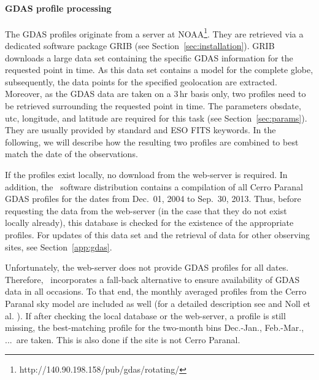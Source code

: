 \paragraph*{GDAS profile processing}
\label{sec:gdas_processing}
The \ac{GDAS} profiles originate from a server at
\ac{NOAA}\footnote{http://140.90.198.158/pub/gdas/rotating/}. They are
retrieved via a dedicated software package \ac{GRIB} (see
Section~\ref{sec:installation}). \ac{GRIB} downloads a large data set
containing the specific \ac{GDAS} information for the requested point in time.
As this data set contains a model for the complete globe, subsequently, the
data points for the specified geolocation are extracted. Moreover, as the
\ac{GDAS} data are taken on a 3\,hr basis only, two profiles need to be
retrieved surrounding the requested point in time. The parameters
{\sc obsdate}, {\sc utc}, {\sc longitude}, and {\sc latitude} are required for
this task (see Section~\ref{sec:params}). They are usually provided by standard
and ESO FITS keywords. In the following, we will describe how the resulting two
profiles are combined to best match the date of the observations.

If the profiles exist locally, no
download from the web-server is required. In addition, the \mf\ software
distribution contains a compilation of all Cerro Paranal \ac{GDAS} profiles for
the dates from Dec.~01, 2004 to Sep.~30, 2013. Thus, before requesting the data
from the web-server (in the case that they do not exist locally already), this
database is checked for the existence of the appropriate profiles. For
updates of this data set and the retrieval of data for other observing sites,
see Section~\ref{app:gdas}.

Unfortunately, the web-server does not provide \ac{GDAS} profiles for all
dates. Therefore, \mf\ incorporates a fall-back alternative to ensure
availability of \ac{GDAS} data in all occasions. To that end, the monthly
averaged profiles from the Cerro Paranal sky model are included as well (for a
detailed description see \cite{SM01UM} and Noll et al. \cite{NOL12}). If after
checking the local database or the web-server, a profile is still missing, the
best-matching profile for the two-month bins Dec.-Jan., Feb.-Mar., ...~are
taken. This is also done if the site is not Cerro Paranal.

